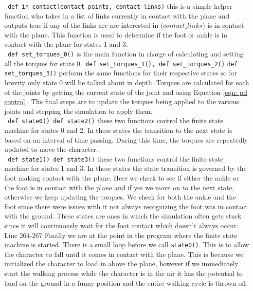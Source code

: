 \documentclass[12pt, a4paper]{article}
\begin{document}
\verb; def in_contact(contact_points, contact_links); this is a simple helper function who takes in a list of links currently in contact with the plane and outputs true if any of the links are are interested in ($contact\_links$) is in contact with the plane. This function is used to determine if the foot or ankle is in contact with the plane for states 1 and 3.\\

\verb; def set_torques_0(); is the main function in charge of calculating and setting all the torques for state 0.\verb; def set_torques_1(), def set_torques_2(); \verb;def set_torques_3(); perform the same functions for their respective states so for brevity only state 0 will be talked about in depth. Torques are calculated for each of the joints by getting the current state of the joint and using Equation \ref{eqn: pd control}. The final steps are to update the torques being applied to the various joints and stepping the simulation to apply them.\\

\verb; def state0() def state2(); these two functions control the finite state machine for states 0 and 2. In these states the transition to the next state is based on an interval of time passing. During this time, the torques are repeatedly updated to move the character.\\

\verb; def state1() def state3(); these two functions control the finite state machine for states 1 and 3. In these states the state transition is governed by the foot making contact with the plane. Here we check to see if either the ankle or the foot is in contact with the plane and if yes we move on to the next state, otherwise we keep updating the torques. We check for both the ankle and the foot since there were issues with it not always recognizing the foot was in contact with the ground. These states are ones in which the simulation often gets stuck since it will continuously wait for the foot contact which doesn't always occur.\\

Line 264-267 Finally we are at the point in the program where the finite state machine is started. There is a small loop before we call \verb;state0();. This is to allow the character to fall until it comes in contact with the plane. This is because we initialized the character to load in above the plane, however if we immediately start the walking process while the character is in the air it has the potential to land on the ground in a funny position and the entire walking cycle is thrown off.
\end{document}
